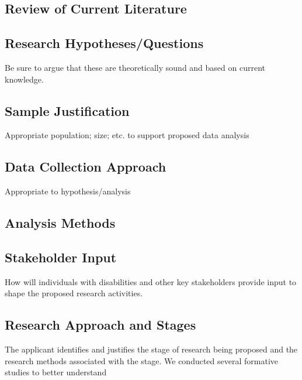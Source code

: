 \subsection{Review of Current Literature}
\subsection{Research Hypotheses/Questions}
Be sure to argue that these are theoretically sound and based on current knowledge.
\subsection{Sample Justification}
Appropriate population; size; etc. to support proposed data analysis
\subsection{Data Collection Approach}
Appropriate to hypothesis/analysis
\subsection{Analysis Methods}
\subsection{Stakeholder Input}
How will individuals with disabilities and other key stakeholders provide input to shape the proposed research activities.
\subsection{Research Approach and Stages}
     The applicant identifies and justifies the stage of research being proposed and the research methods associated with the stage.
We conducted several formative studies to better understand


